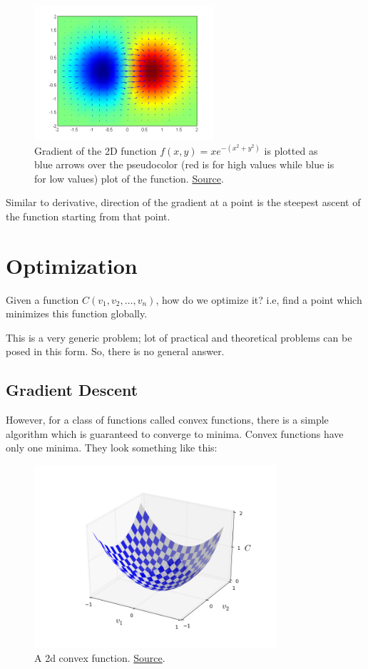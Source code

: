 \documentclass[a4paper]{tufte-handout}
\begin{document}
\begin{figure}
  \includegraphics[height=50mm]{gradient.png}
  \caption{Gradient of the 2D function \(f(x, y) = xe^{−(x^2 + y^2)}\) is
plotted as blue arrows over the pseudocolor (red is for high values
while blue is for low values) plot of the function.
\href{https://en.wikipedia.org/wiki/Gradient}{Source}.}
\end{figure}


Similar to derivative, direction of the gradient at a point is the
steepest ascent of the function starting from that point.

\section{Optimization}\label{optimization}

Given a function \(C(v_1, v_2, \ldots, v_n)\), how do we optimize it?
i.e, find a point which minimizes this function globally.

This is a very generic problem; lot of practical and theoretical
problems can be posed in this form. So, there is no general answer.

\subsection{Gradient Descent}\label{gradient-descent}

However, for a class of functions called convex functions, there is a
simple algorithm which is guaranteed to converge to minima. Convex
functions have only one minima. They look something like this:

\begin{figure}
  \includegraphics[width=90mm]{valley.png}
  \caption{A 2d convex function. 
  			\href{http://neuralnetworksanddeeplearning.com/chap1.html}{Source}.}
\end{figure}
\end{document}

